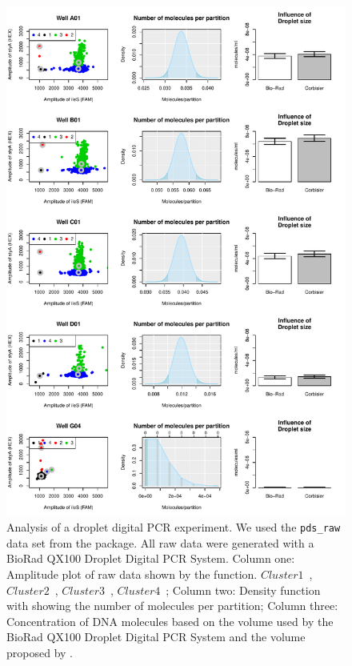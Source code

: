 \begin{figure}[htbp]
\centering
  \includegraphics[clip=true, width=14cm]{figures/dpcR_bioamp.pdf}
    \caption{Analysis of a droplet digital PCR experiment. We used the 
\texttt{pds\_raw} data set from the  package. All raw data were 
generated with a BioRad QX100 Droplet Digital PCR System. Column one: Amplitude 
plot of raw data shown by the  function. $Cluster 
1$~\textcolor{black}{\textbf{\textbullet}}, $Cluster 
2$~\textcolor{red}{\textbf{\textbullet}}, $Cluster 
3$~\textcolor{green}{\textbf{\textbullet}}, $Cluster 
4$~\textcolor{blue}{\textbf{\textbullet}}; Column two: Density function with 
showing the number of molecules per partition; Column three: Concentration of 
DNA molecules based on the volume used by the BioRad QX100 Droplet Digital PCR 
System and the volume proposed by \citet{corbisier_2015}. 
    }  \label{figure:dpcR_bioamp}
\end{figure}

